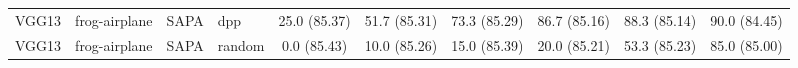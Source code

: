 \begin{table}[h]
{\begin{tabular}{llllcccccc}
VGG13 & frog-airplane & SAPA & dpp
& 25.0 \small{(85.37)}
& 51.7 \small{(85.31)}
& 73.3 \small{(85.29)}
& 86.7 \small{(85.16)}
& 88.3 \small{(85.14)}
& 90.0 \small{(84.45)}\\


VGG13 & frog-airplane & SAPA & random
& 0.0 \small{(85.43)}
& 10.0 \small{(85.26)}
& 15.0 \small{(85.39)}
& 20.0 \small{(85.21)}
& 53.3 \small{(85.23)}
& 85.0 \small{(85.00)} \\ [0.1em]


\hline
\end{tabular}
}

\end{table}


